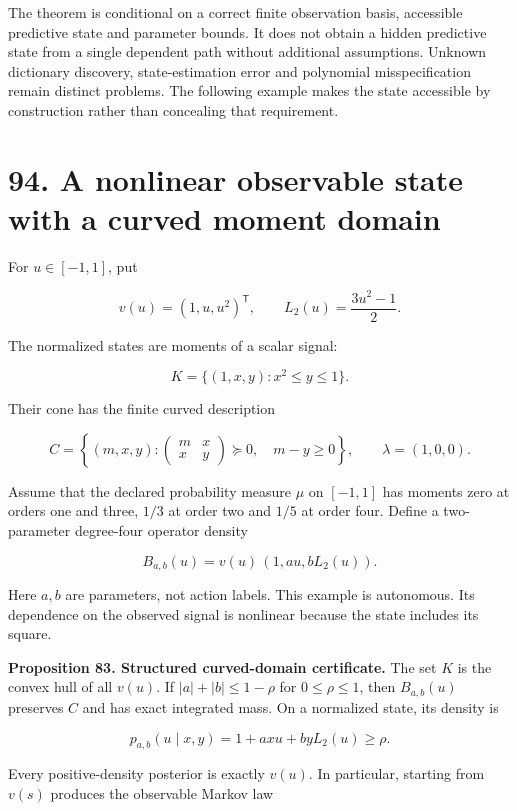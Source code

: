 \documentclass[11pt,letterpaper]{article}
\begin{document}
The theorem is conditional on a correct finite observation basis,
accessible predictive state and parameter bounds. It does not obtain a
hidden predictive state from a single dependent path without additional
assumptions. Unknown dictionary discovery, state-estimation error and
polynomial misspecification remain distinct problems. The following
example makes the state accessible by construction rather than
concealing that requirement.

\newpage

\section{94. A nonlinear observable state with a curved moment
domain}\label{a-nonlinear-observable-state-with-a-curved-moment-domain}

For \(u\in[-1,1]\), put

\[
v(u)=(1,u,u^2)^{\mathsf T},
\qquad L_2(u)=\frac{3u^2-1}{2}.
\]

The normalized states are moments of a scalar signal:

\[
K=\{(1,x,y):x^2\leq y\leq1\}.
\]

Their cone has the finite curved description

\[
C=\left\{(m,x,y):
\begin{pmatrix}m&x\\x&y\end{pmatrix}\succeq0,
\quad m-y\geq0\right\},
\qquad\lambda=(1,0,0).
\]

Assume that the declared probability measure \(\mu\) on \([-1,1]\) has
moments zero at orders one and three, \(1/3\) at order two and \(1/5\)
at order four. Define a two-parameter degree-four operator density

\[
\boxed{
B_{a,b}(u)=v(u)\,(1,au,bL_2(u)).
}
\]

Here \(a,b\) are parameters, not action labels. This example is
autonomous. Its dependence on the observed signal is nonlinear because
the state includes its square.

\textbf{Proposition 83. Structured curved-domain certificate.} The set
\(K\) is the convex hull of all \(v(u)\). If \(|a|+|b|\leq1-\rho\) for
\(0\leq\rho\leq1\), then \(B_{a,b}(u)\) preserves \(C\) and has exact
integrated mass. On a normalized state, its density is

\[
p_{a,b}(u\mid x,y)=1+a x u+b yL_2(u)\geq\rho.
\]

Every positive-density posterior is exactly \(v(u)\). In particular,
starting from \(v(s)\) produces the observable Markov law
\end{document}
